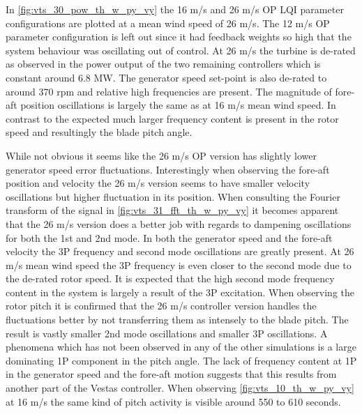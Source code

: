 \clearpage
In \cref{fig:vts_30_pow_th_w_py_vy} the 16 m/s and 26 m/s OP LQI parameter configurations are plotted at a mean wind speed of 26 m/s. The 12 m/s OP parameter configuration is left out since it had feedback weights so high that the system behaviour was oscillating out of control. At 26 m/s the turbine is de-rated as observed in the power output of the two remaining controllers which is constant around 6.8 MW. The generator speed set-point is also de-rated to around 370 rpm and relative high frequencies are present. The magnitude of fore-aft position oscillations is largely the same as at 16 m/s mean wind speed. In contrast to the expected much larger frequency content is present in the rotor speed and resultingly the blade pitch angle.

While not obvious it seems like the 26 m/s OP version has slightly lower generator speed error fluctuations. Interestingly when observing the fore-aft position and velocity the 26 m/s version seems to have smaller velocity oscillations but higher fluctuation in its position. When consulting the Fourier transform of the signal in \cref{fig:vts_31_fft_th_w_py_vy} it becomes apparent that the 26 m/s version does a better job with regards to dampening oscillations for both the 1st and 2nd mode. In both the generator speed and the fore-aft velocity the 3P frequency and second mode oscillations are greatly present. At 26 m/s mean wind speed the 3P frequency is even closer to the second mode due to the de-rated rotor speed. It is expected that the high second mode frequency content in the system is largely a result of the 3P excitation. When observing the rotor pitch it is confirmed that the 26 m/s controller version handles the fluctuations better by not transferring them as intensely to the blade pitch. The result is vastly smaller 2nd mode oscillations and smaller 3P oscillations. A phenomena which has not been observed in any of the other simulations is a large dominating 1P component in the pitch angle. The lack of frequency content at 1P in the generator speed and the fore-aft motion suggests that this results from another part of the Vestas controller. When observing \cref{fig:vts_10_th_w_py_vy} at 16 m/s the same kind of pitch activity is visible around 550 to 610 seconds.

